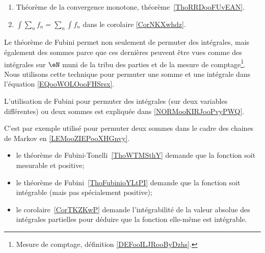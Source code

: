 \begin{description}
\begin{enumerate}
			\item
			      Théorème de la convergence monotone, théorème~\ref{ThoRRDooFUvEAN}.
			\item
			      \( \int \sum_n f_n=\sum_n\int f_n\) dans le corolaire \ref{CorNKXwhdz}.
		\end{enumerate}
	\item[Fubini]
		Le théorème de Fubini permet non seulement de permuter des intégrales, mais également des sommes parce que ces dernières peuvent être vues comme des intégrales sur \( \eN\) muni de la tribu des parties et de la mesure de comptage\footnote{Mesure de comptage, définition \ref{DEFooILJRooByDzhs}.}. Nous utilisons cette technique pour permuter une somme et une intégrale dans l'équation \eqref{EQooWOLOooFHSrsx}.
	\item
	      L'utilisation de Fubini pour permuter des intégrales (sur deux variables différentes) ou deux sommes est expliquée dans \ref{NORMooKIRJooPvyPWQ}.

	      C'est par exemple utilisé pour permuter deux sommes dans le cadre des chaines de Markov en \ref{LEMooZIEPooXHGnvy}.
	      \begin{itemize}
		      \item
		            le théorème de Fubini-Tonelli~\ref{ThoWTMSthY} demande que la fonction soit mesurable et positive;
		      \item
		            le théorème de Fubini~\ref{ThoFubinioYLtPI} demande que la fonction soit intégrable (mais pas spécialement positive);
		      \item
		            le corolaire~\ref{CorTKZKwP} demande l'intégrabilité de la valeur absolue des intégrales partielles pour déduire que la fonction elle-même est intégrable.
	      \end{itemize}


\end{description}
